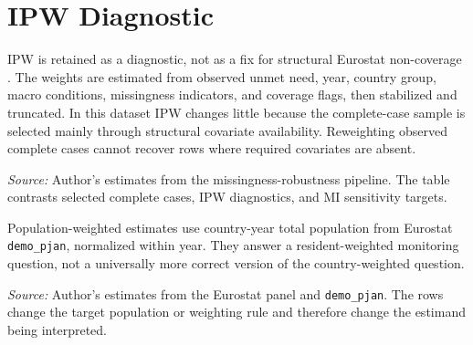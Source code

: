 \section{IPW Diagnostic}

IPW is retained as a diagnostic, not as a fix for structural Eurostat non-coverage \citep{seaman_white_2013}. The weights are estimated from observed unmet need, year, country group, macro conditions, missingness indicators, and coverage flags, then stabilized and truncated. In this dataset IPW changes little because the complete-case sample is selected mainly through structural covariate availability. Reweighting observed complete cases cannot recover rows where required covariates are absent.

\begin{table}[H]
\centering
\small
\caption{Missingness-aware comparison of the poverty association. Complete-case and IPW rows use the selected FE sample with country-clustered SE; MI rows pool estimates over imputed outcome-observed panels.}
\label{tab:missingness_robustness_results}

\vspace{0.25em}

\begin{minipage}{0.92\textwidth}
\scriptsize \textit{Source:} Author's estimates from the missingness-robustness pipeline. The table contrasts selected complete cases, IPW diagnostics, and MI sensitivity targets.
\end{minipage}
\end{table}

Population-weighted estimates use country-year total population from Eurostat \texttt{demo\_pjan}, normalized within year. They answer a resident-weighted monitoring question, not a universally more correct version of the country-weighted question.

\clearpage

\begin{table}[H]
\centering
\scriptsize
\caption{Target-population sensitivity of the poverty association. Rows compare unweighted, year-normalized population-weighted, balanced-outcome, and MI full-target estimands; complete-case rows use country-clustered FE estimates.}
\label{tab:target_population_sensitivity_results}

\vspace{0.25em}

\begin{minipage}{0.96\textwidth}
\scriptsize \textit{Source:} Author's estimates from the Eurostat panel and \texttt{demo\_pjan}. The rows change the target population or weighting rule and therefore change the estimand being interpreted.
\end{minipage}
\end{table}

